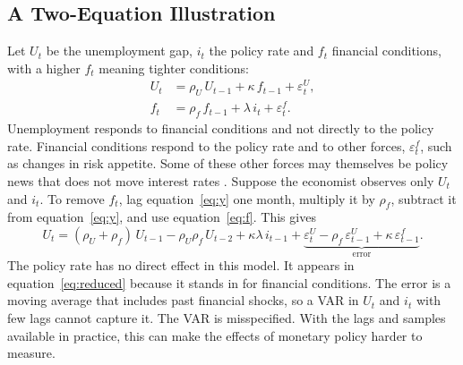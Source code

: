 \documentclass[11pt]{article}
\begin{document}
\FloatBarrier
\newpage
\begin{appendices}
\renewcommand{\thetable}{\Alph{section}\arabic{table}}
\renewcommand{\thefigure}{\Alph{section}\arabic{figure}}
\setcounter{table}{0}
\setcounter{figure}{0}
\FloatBarrier
\section{A Two-Equation Illustration}\label{app:toy}
Let $U_t$ be the unemployment gap, $i_t$ the policy rate and $f_t$ financial conditions, with a higher $f_t$ meaning tighter conditions:
\begin{align}
U_t &= \rho_U\,U_{t-1} + \kappa\,f_{t-1} + \varepsilon^{U}_t, \label{eq:y}\\
f_t &= \rho_f\,f_{t-1} + \lambda\,i_t + \varepsilon^{f}_t. \label{eq:f}
\end{align}
Unemployment responds to financial conditions and not directly to the policy rate. Financial conditions respond to the policy rate and to other forces, $\varepsilon^{f}_t$, such as changes in risk appetite. Some of these other forces may themselves be policy news that does not move interest rates \citep{boehm2024,bauer2026}. Suppose the economist observes only $U_t$ and $i_t$. To remove $f_t$, lag equation~\eqref{eq:y} one month, multiply it by $\rho_f$, subtract it from equation~\eqref{eq:y}, and use equation~\eqref{eq:f}. This gives
\begin{equation}
U_t = (\rho_U+\rho_f)\,U_{t-1} - \rho_U\rho_f\,U_{t-2} + \kappa\lambda\,i_{t-1} + \underbrace{\varepsilon^{U}_t - \rho_f\,\varepsilon^{U}_{t-1} + \kappa\,\varepsilon^{f}_{t-1}}_{\text{error}}. \label{eq:reduced}
\end{equation}
The policy rate has no direct effect in this model. It appears in equation~\eqref{eq:reduced} because it stands in for financial conditions. The error is a moving average that includes past financial shocks, so a VAR in $U_t$ and $i_t$ with few lags cannot capture it. The VAR is misspecified. With the lags and samples available in practice, this can make the effects of monetary policy harder to measure.

\FloatBarrier

\end{appendices}
\end{document}
